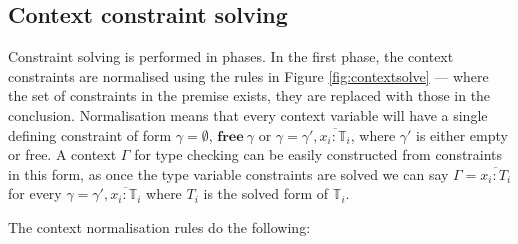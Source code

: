 \documentclass{article}
\newcommand{\figref}[1]{Figure \ref{#1}}
\newcommand{\free}[1]{\mathbf{free}\:#1}
\begin{document}
\subsection{Context constraint solving}

Constraint solving is performed in phases. In the first phase, the context 
constraints
are normalised using the rules in \figref{fig:contextsolve} --- where the set of 
constraints in the premise exists, they are replaced with those in the 
conclusion. Normalisation means that every context variable will have a single 
defining constraint of form $\gamma = \emptyset$, $\free{\gamma}$ or
$\gamma = \gamma', \overline{x_i : \mathbb{T}_i}$, where $\gamma'$ is
either empty or free. A context $\Gamma$ for type checking can be easily
constructed from constraints in this form, as once the type variable
constraints are solved we can say $\Gamma = \overline{x_i : T_i}$ for
every $\gamma = \gamma', \overline{x_i : \mathbb{T}_i}$ where $T_i$ is the
solved form of $\mathbb{T}_i$.

The context normalisation rules do the following:
\end{document}
